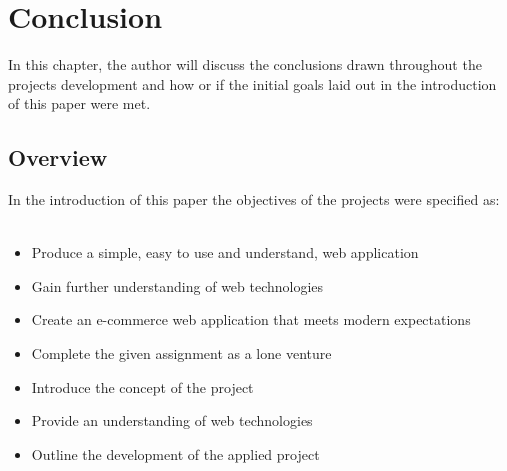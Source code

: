\chapter{Conclusion}
In this chapter, the author will discuss the conclusions drawn throughout the projects development and how or if the initial goals laid out in the introduction of this paper were met.

\section{Overview}
In the introduction of this paper the objectives of the projects were specified as: \\ \\

\begin{itemize}
    \item Produce a simple, easy to use and understand, web application
    \item Gain further understanding of web technologies
    \item Create an e-commerce web application that meets modern expectations
    \item Complete the given assignment as a lone venture
    \item Introduce the concept of the project
    \item Provide an understanding of web technologies
    \item Outline the development of the applied project
\end{itemize}

\newpage

